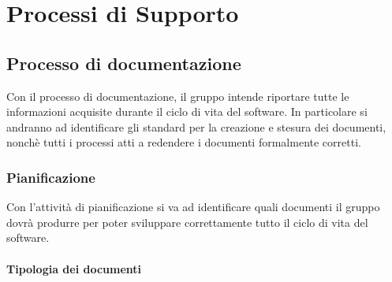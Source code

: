 %


\section{Processi di Supporto}

\subsection{Processo di documentazione}
Con il processo di documentazione, il gruppo \groupName intende riportare tutte le informazioni acquisite durante il ciclo di vita del software.
In particolare si andranno ad identificare gli standard per la creazione e stesura dei documenti, nonchè tutti i processi atti a redendere i documenti formalmente corretti.

	\subsubsection{Pianificazione}
	Con l'attività di pianificazione si va ad identificare quali documenti il gruppo dovrà produrre per poter sviluppare correttamente tutto il ciclo di vita del software. 




		\paragraph{Tipologia dei documenti}
	
